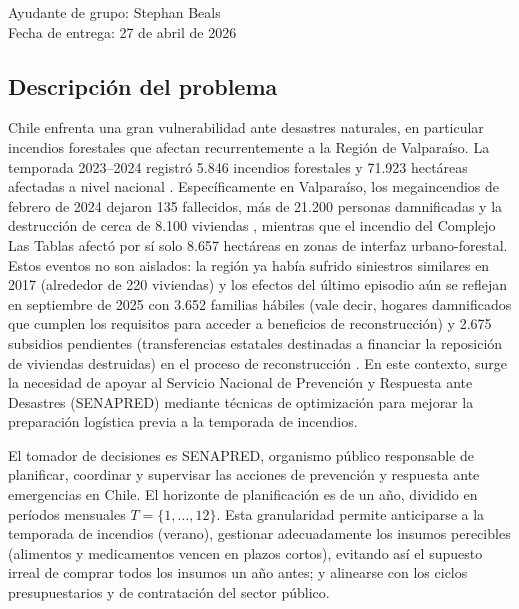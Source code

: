 \documentclass[letterpaper]{article}
\begin{document}
\vspace*{5mm}
{\large Ayudante de grupo: Stephan Beals\\}
{\large Fecha de entrega: 27 de abril de 2026\\}


\newpage
\begin{flushleft}
\tableofcontents
\end{flushleft}

\newpage
\begin{flushleft}
\end{flushleft}

\begin{flushleft}

\section{Descripci\'on del problema}

Chile enfrenta una gran vulnerabilidad ante desastres naturales, en particular incendios forestales que afectan recurrentemente a la Regi\'on de Valpara\'iso. La temporada 2023--2024 registr\'o 5.846 incendios forestales y 71.923 hect\'areas afectadas a nivel nacional \cite{conaf2024}. Espec\'ificamente en Valpara\'iso, los megaincendios de febrero de 2024 dejaron 135 fallecidos, m\'as de 21.200 personas damnificadas y la destrucci\'on de cerca de 8.100 viviendas \cite{minds2024plan}, mientras que el incendio del Complejo Las Tablas afect\'o por s\'i solo 8.657 hect\'areas en zonas de interfaz urbano-forestal. Estos eventos no son aislados: la regi\'on ya hab\'ia sufrido siniestros similares en 2017 (alrededor de 220 viviendas) y los efectos del \'ultimo episodio a\'un se reflejan en septiembre de 2025 con 3.652 familias h\'abiles (vale decir, hogares damnificados que cumplen los requisitos para acceder a beneficios de reconstrucci\'on) y 2.675 subsidios pendientes (transferencias estatales destinadas a financiar la reposici\'on de viviendas destruidas) en el proceso de reconstrucci\'on \cite{minvu2025}. En este contexto, surge la necesidad de apoyar al Servicio Nacional de Prevenci\'on y Respuesta ante Desastres (SENAPRED) mediante t\'ecnicas de optimizaci\'on para mejorar la preparaci\'on log\'istica previa a la temporada de incendios.

El tomador de decisiones es SENAPRED, organismo p\'ublico responsable de planificar, coordinar y supervisar las acciones de prevenci\'on y respuesta ante emergencias en Chile. El horizonte de planificaci\'on es de un a\~no, dividido en per\'iodos mensuales $T = \{1,\dots,12\}$. Esta granularidad permite anticiparse a la temporada de incendios (verano), gestionar adecuadamente los insumos perecibles (alimentos y medicamentos vencen en plazos cortos), evitando as\'i el supuesto irreal de comprar todos los insumos un a\~no antes; y alinearse con los ciclos presupuestarios y de contrataci\'on del sector p\'ublico.


\end{flushleft}
\end{document}
